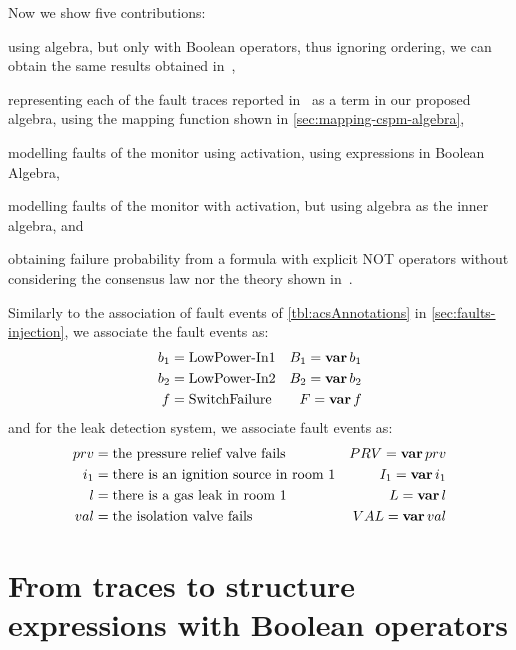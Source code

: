 Now we show five contributions:
\begin{alineasinline}
  \item using \ac{algebra}, but only with Boolean operators, thus ignoring ordering, we can obtain the same results obtained in~\cite{DM2012}, 
  \item representing each of the fault traces reported in~\cite{DM2012} as a term in our proposed \ac{algebra}, using the mapping function shown in \cref{sec:mapping-cspm-algebra},
  \item modelling faults of the monitor using \ac{activation}, using expressions in Boolean Algebra, 
  \item modelling faults of the monitor with \ac{activation}, but using \ac{algebra} as the inner algebra, and
  \item obtaining failure probability from a formula with explicit \ac{NOT} operators without considering the consensus law nor the theory shown in~\cite{Andrews2001}.
\end{alineasinline}
%
Similarly to the association of fault events of \cref{tbl:acsAnnotations} in \cref{sec:faults-injection}, we associate the fault events as:
%
\begin{align*}
b_1 &= \text{LowPower-In1}& B_1 = \operatorname{\mathbf{var}} b_1\\
b_2 &= \text{LowPower-In2}& B_2 = \operatorname{\mathbf{var}} b_2\\
f &= \text{SwitchFailure}& F = \operatorname{\mathbf{var}} f
\end{align*}
%
and for the leak detection system, we associate fault events as:
%
\begin{align*}
prv & = \text{the pressure relief valve fails} & PRV = \operatorname{\mathbf{var}} prv\\
i_1 & = \text{there is an ignition source in room 1} &I_1 = \operatorname{\mathbf{var}} i_1\\
l & = \text{there is a gas leak in room 1} & L = \operatorname{\mathbf{var}} l\\
val & = \text{the isolation valve fails} & VAL = \operatorname{\mathbf{var}} val
\end{align*}

\section{From traces to structure expressions with Boolean operators}
\label{sec:traces-to-structure-expressions-boolean-operators}

